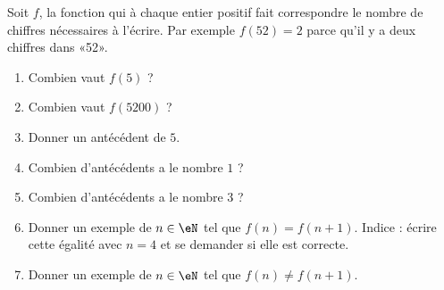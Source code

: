 
\begin{exercice}\label{exoSeconde-0054}

    Soit \( f\), la fonction qui à chaque entier positif fait correspondre le nombre de chiffres nécessaires à l'écrire. Par exemple \( f(52)=2\) parce qu'il y a deux chiffres dans «52».
    \begin{multicols}{2}
        \begin{enumerate}
            \item
            Combien vaut \( f(5)\) ?
        \item
            Combien vaut \( f(5200)\) ?
        \item
            Donner un antécédent de \( 5\).
        \item
            Combien d'antécédents a le nombre \( 1\) ?
        \item
            Combien d'antécédents a le nombre \( 3\) ?
        \item
            Donner un exemple de \( n\in \eN\) tel que \( f(n)=f(n+1)\). Indice : écrire cette égalité avec \( n=4\) et se demander si elle est correcte.
        \item
            Donner un exemple de \( n\in \eN\) tel que \( f(n)\neq f(n+1)\).
        \end{enumerate}
    \end{multicols}

\end{exercice}
